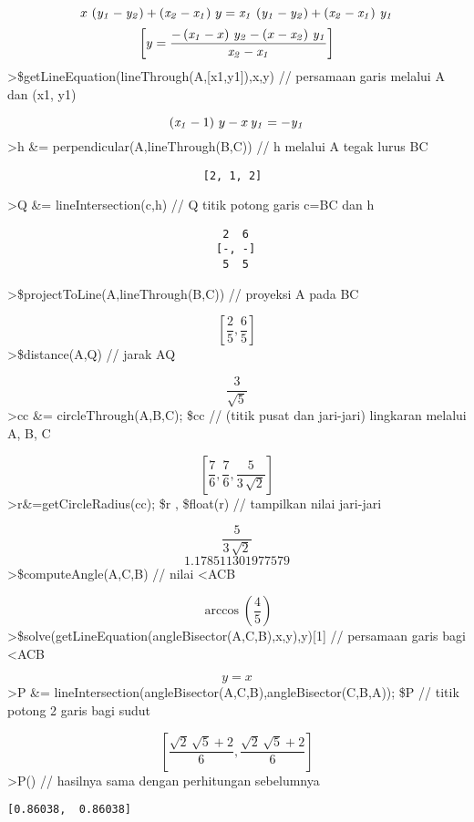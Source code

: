\documentclass[
]{book}
\begin{document}
\[x\,\left({\it y_1}-{\it y_2}\right)+\left({\it x_2}-{\it x_1}
 \right)\,y={\it x_1}\,\left({\it y_1}-{\it y_2}\right)+\left(
 {\it x_2}-{\it x_1}\right)\,{\it y_1}\]\[\left[ y=\frac{-\left({\it x_1}-x\right)\,{\it y_2}-\left(x-
 {\it x_2}\right)\,{\it y_1}}{{\it x_2}-{\it x_1}} \right] \]\textgreater\$getLineEquation(lineThrough(A,{[}x1,y1{]}),x,y) // persamaan garis melalui A dan (x1, y1)

\[\left({\it x_1}-1\right)\,y-x\,{\it y_1}=-{\it y_1}\]\textgreater h \&= perpendicular(A,lineThrough(B,C)) // h melalui A tegak lurus BC

\begin{verbatim}
                              [2, 1, 2]
\end{verbatim}

\textgreater Q \&= lineIntersection(c,h) // Q titik potong garis c=BC dan h

\begin{verbatim}
                                 2  6
                                [-, -]
                                 5  5
\end{verbatim}

\textgreater\$projectToLine(A,lineThrough(B,C)) // proyeksi A pada BC

\[\left[ \frac{2}{5} , \frac{6}{5} \right] \]\textgreater\$distance(A,Q) // jarak AQ

\[\frac{3}{\sqrt{5}}\]\textgreater cc \&= circleThrough(A,B,C); \$cc // (titik pusat dan jari-jari) lingkaran melalui A, B, C

\[\left[ \frac{7}{6} , \frac{7}{6} , \frac{5}{3\,\sqrt{2}} \right] \]\textgreater r\&=getCircleRadius(cc); \$r , \$float(r) // tampilkan nilai jari-jari

\[\frac{5}{3\,\sqrt{2}}\]\[1.178511301977579\]\textgreater\$computeAngle(A,C,B) // nilai \textless ACB

\[\arccos \left(\frac{4}{5}\right)\]\textgreater\$solve(getLineEquation(angleBisector(A,C,B),x,y),y){[}1{]} // persamaan garis bagi \textless ACB

\[y=x\]\textgreater P \&= lineIntersection(angleBisector(A,C,B),angleBisector(C,B,A)); \$P // titik potong 2 garis bagi sudut

\[\left[ \frac{\sqrt{2}\,\sqrt{5}+2}{6} , \frac{\sqrt{2}\,\sqrt{5}+2
 }{6} \right] \]\textgreater P() // hasilnya sama dengan perhitungan sebelumnya

\begin{verbatim}
[0.86038,  0.86038]
\end{verbatim}
\end{document}
